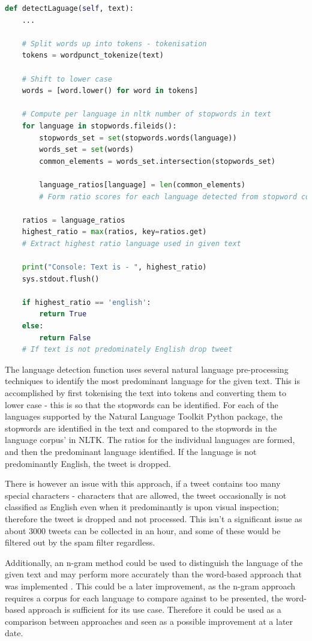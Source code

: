 \documentclass[oneside, 12pt]{article}
\begin{document}
			\begin{lstlisting}[language=python, caption=Language detection and filter function \cite{langdectNLTK}]
def detectLaguage(self, text):
	...
	
	# Split words up into tokens - tokenisation
	tokens = wordpunct_tokenize(text)
	
	# Shift to lower case
	words = [word.lower() for word in tokens]

	# Compute per language in nltk number of stopwords in text
	for language in stopwords.fileids():
		stopwords_set = set(stopwords.words(language))
		words_set = set(words)
		common_elements = words_set.intersection(stopwords_set)

		language_ratios[language] = len(common_elements) 
		# Form ratio scores for each language detected from stopword comparison

	ratios = language_ratios
	highest_ratio = max(ratios, key=ratios.get)
	# Extract highest ratio language used in given text

	print("Console: Text is - ", highest_ratio)
	sys.stdout.flush()

	if highest_ratio == 'english':
		return True
	else:
		return False
	# If text is not predominately English drop tweet
			\end{lstlisting}
			
			The language detection function uses several natural language pre-processing techniques to identify the most predominant language for the given text. This is accomplished by first tokenising the text into tokens and converting them to lower case - this is so that the stopwords can be identified. For each of the languages supported by the Natural Language Toolkit Python package, the stopwords are identified in the text and compared to the stopwords in the language corpus' in NLTK. The ratios for the individual languages are formed, and then the predominant language identified. If the language is not predominantly English, the tweet is dropped. 
			
			There is however an issue with this approach, if a tweet contains too many special characters - characters that are allowed, the tweet occasionally is not classified as English even when it predominantly is upon visual inspection; therefore the tweet is dropped and not processed. This isn't a significant issue as about 3000 tweets can be collected in an hour, and some of these would be filtered out by the spam filter regardless.
			
			Additionally, an n-gram method could be used to distinguish the language of the given text and may perform more accurately than the word-based approach that was implemented \cite{LanNgram}. This could be a later improvement, as the n-gram approach requires a corpus for each language to compare against to be presented, the word-based approach is sufficient for its use case. Therefore it could be used as a comparison between approaches and seen as a possible improvement at a later date.
			
\end{document}
